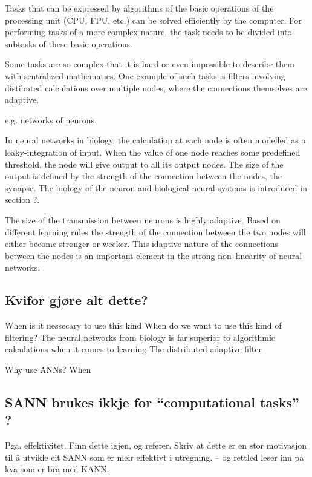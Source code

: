 	Tasks that can be expressed by algorithms of the basic operations of the processing unit (CPU, FPU, etc.) can be solved efficiently by the computer.
	For performing tasks of a more complex nature, the task needs to be divided into subtasks of these basic operations.

	Some tasks are so complex that it is hard or even impossible to describe them with sentralized mathematics.
	One example of such tasks is filters involving distibuted calculations over multiple nodes, where the connections themselves are adaptive.

	e.g. networks of neurons.

	In neural networks in biology, the calculation at each node is often modelled as a leaky-integration of input.
	When the value of one node reaches some predefined threshold, the node will give output to all its output nodes.
	The size of the output is defined by the strength of the connection between the nodes, the synapse.
	The biology of the neuron and biological neural systems is introduced in section ?.

	The size of the transmission between neurons is highly adaptive. Based on different learning rules the strength of the connection between the two nodes will either become stronger or weeker.
	This idaptive nature of the connections between the nodes is an important element in the strong non--linearity of neural networks.

	\subsection{Kvifor gjøre alt dette?}
	When is it nessecary to use this kind
	When do we want to use this kind of filtering?
	The neural networks from biology is far superior to algorithmic calculations when it comes to learning
	The distributed adaptive filter 

	Why use ANNs? 
	When 



	\subsection{SANN brukes ikkje for ``computational tasks'' ?}
	Pga. effektivitet. Finn dette igjen, og referer. Skriv at dette er en stor motivasjon til å utvikle eit SANN som er meir effektivt i utregning.
	-- og rettled leser inn på kva som er bra med KANN.















